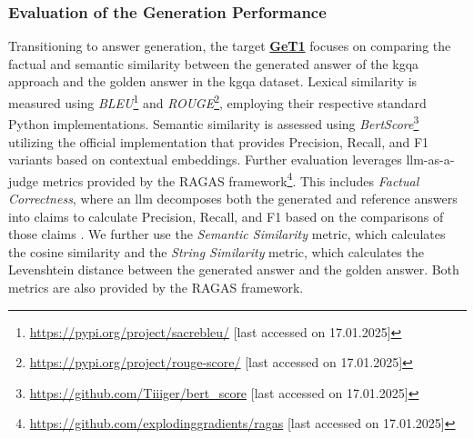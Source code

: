 

\subsubsection{Evaluation of the Generation Performance}

Transitioning to answer generation, the target \hyperref[enum:get1]{\textbf{GeT1}} focuses on comparing the factual and semantic similarity between the generated answer of the \gls{kgqa} approach and the golden answer in the \gls{kgqa} dataset. Lexical similarity is measured using \emph{BLEU}\footnote{\url{https://pypi.org/project/sacrebleu/} [last accessed on 17.01.2025]} and \emph{ROUGE}\footnote{\url{https://pypi.org/project/rouge-score/} [last accessed on 17.01.2025]}, employing their respective standard Python implementations. Semantic similarity is assessed using \emph{BertScore}\footnote{\url{https://github.com/Tiiiger/bert_score} [last accessed on 17.01.2025]} utilizing the official implementation that provides Precision, Recall, and F1 variants based on contextual embeddings. Further evaluation leverages \gls{llm}-as-a-judge metrics provided by the RAGAS framework\footnote{\url{https://github.com/explodinggradients/ragas} [last accessed on 17.01.2025]}. This includes \emph{Factual Correctness}, where an \gls{llm} decomposes both the generated and reference answers into claims to calculate Precision, Recall, and F1 based on the comparisons of those claims \cite{es_ragas_2023}. We further use the \emph{Semantic Similarity} metric, which calculates the cosine similarity and the \emph{String Similarity} metric, which calculates the Levenshtein distance between the generated answer and the golden answer. Both metrics are also provided by the RAGAS framework.

